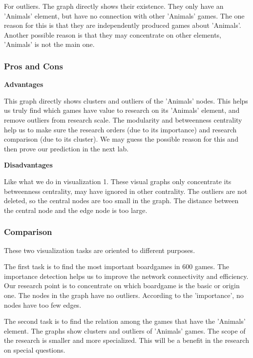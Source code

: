 \documentclass{article}
\begin{document}
For outliers. The graph directly shows their existence. They only have an 'Animals' element, but have no connection with other 'Animals' games. The one reason for this is that they are independently produced games about 'Animals'. Another possible reason is that they may concentrate on other elements, 'Animals' is not the main one.

\subsubsection{Pros and Cons}

\textbf{Advantages}

This graph directly shows clusters and outliers of the 'Animals' nodes. This helps us truly find which games have value to research on its 'Animals' element, and remove outliers from research scale. The modularity and betweenness centrality help us to make sure the research orders (due to its importance) and research comparison (due to its cluster). We may guess the possible reason for this and then prove our prediction in the next lab.

\textbf{Disadvantages}

Like what we do in visualization 1. These visual graphs only concentrate its betweenness centrality, may have ignored in other contrality. The outliers are not deleted, so the central nodes are too small in the graph. The distance between the central node and the edge node is too large.

\subsubsection{Comparison}

\noindent

These two visualization tasks are oriented to different purposes. 

The first task is to find the most important boardgames in 600 games. The importance detection helps us to improve the network connectivity and efficiency. Our research point is to concentrate on which boardgame is the basic or origin one. The nodes in the graph have no outliers. According to the 'importance', no nodes have too few edges.

The second task is to find the relation among the games that have the 'Animals' element. The graphs show clusters and outliers of 'Animals' games. The scope of the research is smaller and more specialized. This will be a benefit in the research on special questions.
\end{document}
